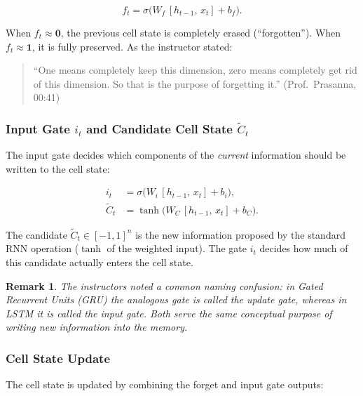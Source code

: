 \documentclass[12pt,a4paper]{article}
\newtheorem{remark}{Remark}[section]
\begin{document}
\begin{equation}
  \label{eq:forget-gate}
  f_t = \sigma\!\bigl(W_f\,[h_{t-1},\,x_t] + b_f\bigr).
\end{equation}

When $f_t \approx \mathbf{0}$, the previous cell state is completely
erased (``forgotten''). When $f_t \approx \mathbf{1}$, it is fully
preserved. As the instructor stated:

\begin{quote}
``One means completely keep this dimension, zero means completely get rid of
this dimension. So that is the purpose of forgetting it.''
\hfill (Prof.\ Prasanna, 00:41)
\end{quote}

\subsubsection{Input Gate $i_t$ and Candidate Cell State $\tilde{C}_t$}
\label{subsubsec:input}

The input gate decides which components of the \emph{current} information
should be written to the cell state:

\begin{align}
  \label{eq:input-gate}
  i_t &= \sigma\!\bigl(W_i\,[h_{t-1},\,x_t] + b_i\bigr), \\
  \label{eq:candidate}
  \tilde{C}_t &= \tanh\!\bigl(W_C\,[h_{t-1},\,x_t] + b_C\bigr).
\end{align}

The candidate $\tilde{C}_t \in [-1,1]^n$ is the new information proposed
by the standard RNN operation ($\tanh$ of the weighted input). The gate
$i_t$ decides how much of this candidate actually enters the cell state.

\begin{remark}
  \label{rem:input-gate-naming}
  The instructors noted a common naming confusion: in Gated Recurrent
  Units (GRU) the analogous gate is called the \emph{update gate}, whereas
  in LSTM it is called the \emph{input gate}. Both serve the same
  conceptual purpose of writing new information into the memory.
\end{remark}

\subsubsection{Cell State Update}
\label{subsubsec:cell-update}

The cell state is updated by combining the forget and input gate outputs:
\end{document}
